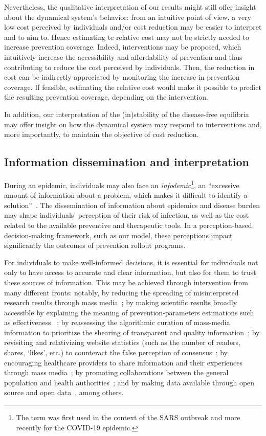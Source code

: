 Nevertheless, the qualitative interpretation of our results might still offer insight about the dynamical system's behavior: from an intuitive point of view, a very low cost perceived by individuals and/or cost reduction may be easier to interpret and to aim to. Hence estimating te relative cost may not be strictly needed to increase prevention coverage. Indeed, interventions may be proposed, which intuitively increase the accessibility and affordability of prevention and thus contributing to reduce the cost perceived by individuals. Then, the reduction in cost can be indirectly appreciated by monitoring the increase in prevention coverage. If feasible, estimating the relative cost would make it possible to predict the resulting prevention coverage, depending on the intervention. 

In addition, our interpretation of the (in)stability of the disease-free equilibria may offer insight on how the dynamical system may respond to interventions and, more importantly, to maintain the objective of cost reduction. 

\subsection{Information dissemination and interpretation}

During an epidemic, individuals may also face an \textit{infodemic}\footnote{The term was first used in the context of the SARS outbreak and more recently for the COVID-19 epidemic.}, an ``excessive amount of information about a problem, which makes it difficult to identify a solution''~\cite[]{WHO_CovidInfodemic}. 
The dissemination of information about epidemics and disease burden may shape individuals' perception of their risk of infection, as well as the cost related to the available preventive and therapeutic tools. In a perception-based decision-making framework, such as our model, these perceptions impact significantly the outcomes of prevention rollout programs.

For individuals to make well-informed decisions, it is essential for individuals not only to have access to accurate and clear information, but also for them to trust these sources of information. This may be achieved through intervention from many different fronts: notably, by reducing the spreading of misinterpreted research results through mass media~\cite[]{Haneef2015}; by making scientific results broadly accessible by explaining the meaning of prevention-parameters estimations such as effectiveness ~\cite[]{Underhill2016}; by reassessing the algorithmic curation of mass-media information to prioritize the shearing of transparent and quality information~\cite[]{Lorenz2020}; by revisiting and relativizing website statistics (such as the number of readers, shares, `likes', etc.) to counteract the false perception of consensus~\cite[]{Lorenz2020}; by encouraging healthcare providers to share information and their experiences through mass media~\cite[]{Hernandez2021}; by promoting collaborations between the general population and health authorities~\cite[]{WHO_InfodemicTraining}; and by making data available through open source and open data~\cite[]{Kobayashi2021}, among others.

